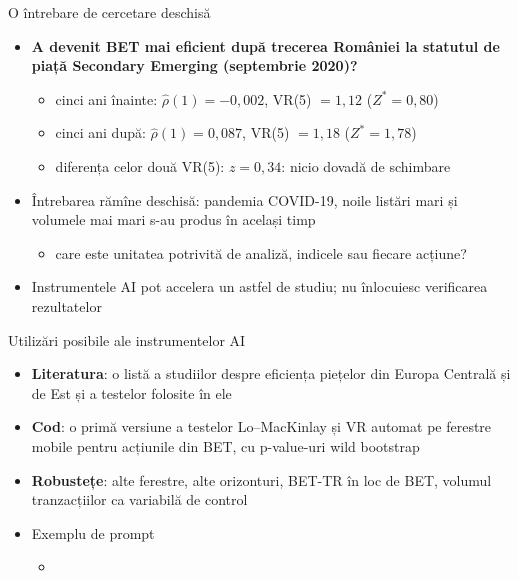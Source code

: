 \begin{frame}{O întrebare de cercetare deschisă}
\itemsize{\small}
\begin{itemize}
    \item \textbf{A devenit BET mai eficient după trecerea României la statutul de piață Secondary Emerging (septembrie 2020)?} 
    \begin{itemize}
        \item cinci ani înainte: $\hat\rho(1) = -0{,}002$, VR(5) $= 1{,}12$ ($Z^* = 0{,}80$)
        \item cinci ani după: $\hat\rho(1) = 0{,}087$, VR(5) $= 1{,}18$ ($Z^* = 1{,}78$)
        \item diferența celor două VR(5): $z = 0{,}34$: nicio dovadă de schimbare
    \end{itemize}
    \item Întrebarea rămîne deschisă: pandemia COVID-19, noile listări mari și volumele mai mari s-au produs în același timp
    \begin{itemize}
        \item care este unitatea potrivită de analiză, indicele sau fiecare acțiune?
    \end{itemize}
    \item Instrumentele AI pot accelera un astfel de studiu; nu înlocuiesc verificarea rezultatelor 
\end{itemize}
\end{frame}

\begin{frame}{Utilizări posibile ale instrumentelor AI}
\itemsize{\small}
\begin{itemize}
    \item \textbf{Literatura}: o listă a studiilor despre eficiența piețelor din Europa Centrală și de Est și a testelor folosite în ele
    \item \textbf{Cod}: o primă versiune a testelor Lo--MacKinlay și VR automat pe ferestre mobile pentru acțiunile din BET, cu p-value-uri wild bootstrap
    \item \textbf{Robustețe}: alte ferestre, alte orizonturi, BET-TR în loc de BET, volumul tranzacțiilor ca variabilă de control
    \item Exemplu de prompt
    \begin{itemize}
        \item {}
    \end{itemize}
\end{itemize}
\end{frame}

